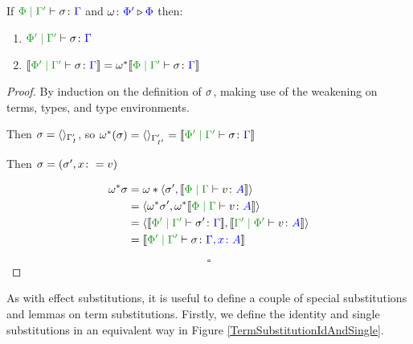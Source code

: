 \documentclass{Report}
\begin{document}
\begin{framed}
    \begin{theorem}\label{EffectWeakeningOnTermSubstitution}
        If $\etyperelation{\P}{\G'}{\si}{\G}$ and $\omega \colon {\color{blue}\Phi'} \triangleright {\color {blue} \Phi}$ then:
        
        \begin{enumerate}[label=\roman*.]
            \item $\etyperelation{\P'}{\G'}{\si}{\G}$
            \item $\deno{\etyperelation{\P'}{\G'}{\si}{\G}} = \w\star\deno{\etyperelation{\P}{\G'}{\si}{\G}}$
        \end{enumerate}
    \end{theorem}
    
    
    \begin{proof}
        By induction on the definition of $\sigma$, making use of the weakening on terms, types, and type environments.
    
        \case{\tsubnil}
        Then $\sigma = \langle\rangle_{\Gamma'_{I}}$, so $\w\star(\si) = \term{\G'_{I'}} = \deno{\etyperelation{\P'}{\G'}{\si}{\G}}$
        
        \case{\tsubextend}
        Then $\sigma = (\sigma',x\colon= v)$
        
        \begin{align*}
            \w\star\si & = \w*\pr{\si'}{\deno{\gpetyperelation{v}{A}}}\\
            & = \pr{\w\star\si'}{\w\star\deno{\gpetyperelation{v}{A}}}\\
            &=\pr{\deno{\etyperelation{\P'}{\G'}{\si'}{\G}}}{\deno{\etyperelation{\G'}{\P'}{v}{A}}}\\
            &=\deno{\etyperelation{\P'}{\G'}{\si}{\gax}}
        \end{align*}
    
        $$\square$$
    
    \end{proof}
\end{framed}

As with effect substitutions, it is useful to define a couple of special substitutions and lemmas on term substitutions. Firstly, we define the identity and single substitutions in an equivalent way in Figure \ref{TermSubstitutionIdAndSingle}.
\end{document}
